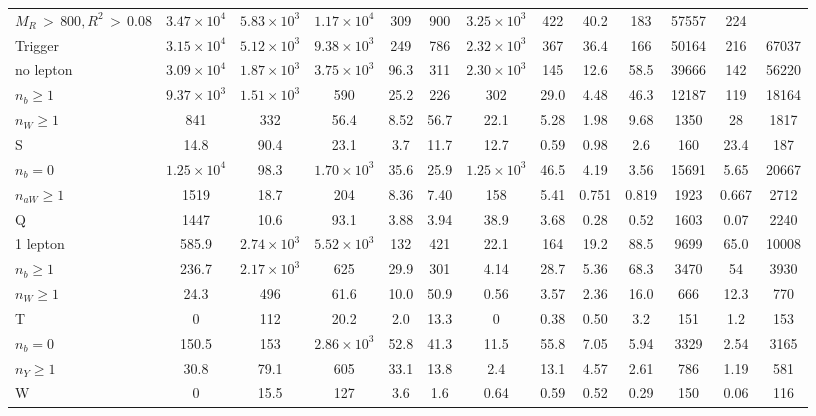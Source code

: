 \begin{sidewaystable}[p]
{\begin{tabular}{ l | c  c  c  c  c  c  c  c  c | c  c  c }
$M_R \,{>}\, 800, R^2 \,{>}\, 0.08$ & $3.47\times 10^4$ & $5.83\times 10^3$ & $1.17\times 10^4$ & 309 & 900 & $3.25\times 10^3$ & 422 & 40.2 & 183 & 57557 & 224 & \\
Trigger & $3.15\times 10^4$ & $5.12\times 10^3$ & $9.38\times 10^3$ & 249 & 786 & $2.32\times 10^3$ & 367 & 36.4 & 166 & 50164 & 216 & 67037 \\
\midrule
no lepton & $3.09\times 10^4$ & $1.87\times 10^3$ & $3.75\times 10^3$ & 96.3 & 311 & $2.30\times 10^3$ & 145 & 12.6 & 58.5 & 39666 & 142 & 56220 \\
\midrule[.02em]
$n_b \geq 1$ & $9.37\times 10^3$ & $1.51\times 10^3$ & 590 & 25.2 & 226 & 302 & 29.0 & 4.48 & 46.3 & 12187 & 119 & 18164 \\
$n_W \geq 1$ & 841 & 332 & 56.4 & 8.52 & 56.7 & 22.1 & 5.28 & 1.98 & 9.68 & 1350 & 28 & 1817  \\
S & 14.8 & 90.4 & 23.1 & 3.7 & 11.7 & 12.7 & 0.59 & 0.98 & 2.6 & 160 & 23.4 & 187 \\
\midrule[.02em]
$n_b = 0$ & $1.25\times 10^4$ & 98.3 & $1.70\times 10^3$ & 35.6 & 25.9 & $1.25\times 10^3$ & 46.5 & 4.19 & 3.56 & 15691 & 5.65 & 20667 \\
$n_{aW} \geq 1$ & 1519 & 18.7 & 204 & 8.36 & 7.40 & 158 & 5.41 & 0.751 & 0.819 & 1923 & 0.667 & 2712 \\
Q & 1447 & 10.6 & 93.1 & 3.88 & 3.94 & 38.9 & 3.68 & 0.28 & 0.52 & 1603 & 0.07 & 2240 \\
\midrule
1 lepton & 585.9 & $2.74\times 10^3$ & $5.52\times 10^3$ & 132 & 421 & 22.1 & 164 & 19.2 & 88.5 & 9699 & 65.0 & 10008 \\
\midrule[.02em]
$n_b \geq 1$ & 236.7 & $2.17\times 10^3$ & 625 & 29.9 & 301 & 4.14 & 28.7 & 5.36 & 68.3 & 3470 & 54 & 3930 \\
$n_W \geq 1$ & 24.3 & 496 & 61.6 & 10.0 & 50.9 & 0.56 & 3.57 & 2.36 & 16.0 & 666 & 12.3 & 770 \\
T & 0 & 112 & 20.2 & 2.0 & 13.3 & 0 & 0.38 & 0.50 & 3.2 & 151 & 1.2 & 153 \\
\midrule[.02em]
$n_b = 0$ & 150.5 & 153 & $2.86\times 10^3$ & 52.8 & 41.3 & 11.5 & 55.8 & 7.05 & 5.94 & 3329 & 2.54 & 3165 \\
$n_Y \geq 1$ & 30.8 & 79.1 & 605 & 33.1 & 13.8 & 2.4 & 13.1 & 4.57 & 2.61 & 786 & 1.19 & 581 \\
W & 0 & 15.5 & 127 & 3.6 & 1.6 & 0.64 & 0.59 & 0.52 & 0.29 & 150 & 0.06 & 116 \\
\bottomrule
\end{tabular}
}
\label{tab:cutflow}
\end{sidewaystable}

